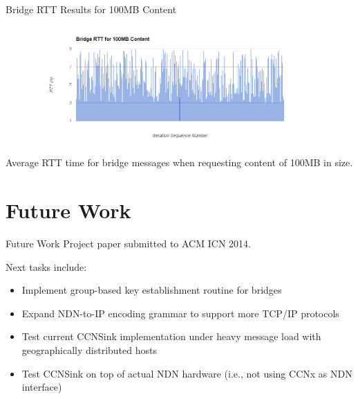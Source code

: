 \documentclass[handout]{beamer}
\begin{document}
\begin{frame}{Bridge RTT Results for 100MB Content}
	\begin{figure}
	\begin{center}
	\includegraphics[scale=0.3]{./img/huge.png}
	\label{fig:perf3}
	\end{center}
	\end{figure}
	Average RTT time for bridge messages when requesting content of 100MB in size.
\end{frame}

\section{Future Work}
\begin{frame}{Future Work}
	Project paper submitted to ACM ICN 2014.

	\medskip

	Next tasks include:
	\begin{itemize}
		\item Implement group-based key establishment routine for bridges
		\item Expand NDN-to-IP encoding grammar to support more TCP/IP protocols
		\item Test current {\sf CCNSink} implementation under heavy message load with geographically distributed hosts
		\item Test {\sf CCNSink} on top of actual NDN hardware (i.e., not using CCNx as NDN interface)
	\end{itemize}
\end{frame}


\end{document}

